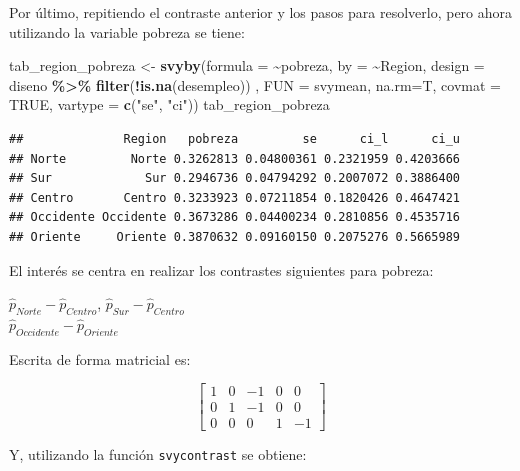 \documentclass[
  spanish,
  12pt,
]{book}
\newenvironment{Shaded}{\begin{snugshade}}{\end{snugshade}}
\newcommand{\AttributeTok}[1]{\textcolor[rgb]{0.13,0.29,0.53}{#1}}
\newcommand{\ConstantTok}[1]{\textcolor[rgb]{0.56,0.35,0.01}{#1}}
\newcommand{\FunctionTok}[1]{\textcolor[rgb]{0.13,0.29,0.53}{\textbf{#1}}}
\newcommand{\NormalTok}[1]{#1}
\newcommand{\OtherTok}[1]{\textcolor[rgb]{0.56,0.35,0.01}{#1}}
\newcommand{\SpecialCharTok}[1]{\textcolor[rgb]{0.81,0.36,0.00}{\textbf{#1}}}
\newcommand{\StringTok}[1]{\textcolor[rgb]{0.31,0.60,0.02}{#1}}
\begin{document}
Por último, repitiendo el contraste anterior y los pasos para resolverlo, pero ahora utilizando la variable pobreza se tiene:

\begin{Shaded}
\begin{Highlighting}[]
\NormalTok{tab\_region\_pobreza }\OtherTok{\textless{}{-}} \FunctionTok{svyby}\NormalTok{(}\AttributeTok{formula =} \SpecialCharTok{\textasciitilde{}}\NormalTok{pobreza, }\AttributeTok{by =} \SpecialCharTok{\textasciitilde{}}\NormalTok{Region, }
                            \AttributeTok{design =}\NormalTok{ diseno }\SpecialCharTok{\%\textgreater{}\%} \FunctionTok{filter}\NormalTok{(}\SpecialCharTok{!}\FunctionTok{is.na}\NormalTok{(desempleo)) , }
                            \AttributeTok{FUN =}\NormalTok{ svymean, }\AttributeTok{na.rm=}\NormalTok{T, }\AttributeTok{covmat =} \ConstantTok{TRUE}\NormalTok{,}
                            \AttributeTok{vartype =} \FunctionTok{c}\NormalTok{(}\StringTok{"se"}\NormalTok{, }\StringTok{"ci"}\NormalTok{))}
\NormalTok{tab\_region\_pobreza}
\end{Highlighting}
\end{Shaded}

\begin{verbatim}
##              Region   pobreza         se      ci_l      ci_u
## Norte         Norte 0.3262813 0.04800361 0.2321959 0.4203666
## Sur             Sur 0.2946736 0.04794292 0.2007072 0.3886400
## Centro       Centro 0.3233923 0.07211854 0.1820426 0.4647421
## Occidente Occidente 0.3673286 0.04400234 0.2810856 0.4535716
## Oriente     Oriente 0.3870632 0.09160150 0.2075276 0.5665989
\end{verbatim}

El interés se centra en realizar los contrastes siguientes para pobreza:

\(\hat{p}_{Norte} - \hat{p}_{Centro}\),
\(\hat{p}_{Sur}-\hat{p}_{Centro}\)\\
\(\hat{p}_{Occidente}-\hat{p}_{Oriente}\)

Escrita de forma matricial es:

\[
\left[\begin{array}{ccccc}
1 & 0 & -1 & 0 & 0\\
0 & 1 & -1 & 0 & 0\\
0 & 0 & 0 & 1 & -1
\end{array}\right]
\]

Y, utilizando la función \texttt{svycontrast} se obtiene:
\end{document}
